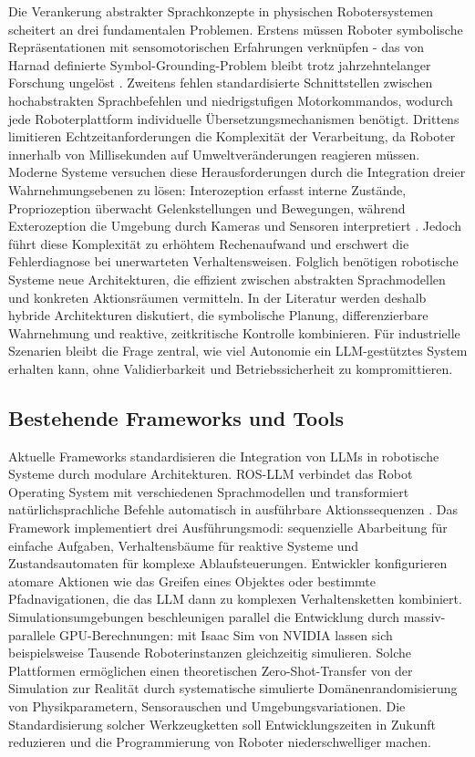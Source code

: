 Die Verankerung abstrakter Sprachkonzepte in physischen Robotersystemen
scheitert an drei fundamentalen Problemen. Erstens müssen Roboter symbolische
Repräsentationen mit sensomotorischen Erfahrungen verknüpfen - das von Harnad
definierte Symbol-Grounding-Problem bleibt trotz jahrzehntelanger Forschung
ungelöst . Zweitens fehlen standardisierte
Schnittstellen zwischen hochabstrakten Sprachbefehlen und niedrigstufigen
Motorkommandos, wodurch jede Roboterplattform individuelle
Übersetzungsmechanismen benötigt. Drittens limitieren Echtzeitanforderungen die
Komplexität der Verarbeitung, da Roboter innerhalb von Millisekunden auf
Umweltveränderungen reagieren müssen. Moderne Systeme versuchen diese
Herausforderungen durch die Integration dreier Wahrnehmungsebenen zu lösen:
Interozeption erfasst interne Zustände, Propriozeption überwacht
Gelenkstellungen und Bewegungen, während Exterozeption die Umgebung durch
Kameras und Sensoren interpretiert . Jedoch führt
diese Komplexität zu erhöhtem Rechenaufwand und erschwert die Fehlerdiagnose bei
unerwarteten Verhaltensweisen. Folglich benötigen robotische Systeme neue
Architekturen, die effizient zwischen abstrakten Sprachmodellen und konkreten
Aktionsräumen vermitteln. In der Literatur werden deshalb hybride Architekturen
diskutiert, die symbolische Planung, differenzierbare Wahrnehmung und reaktive,
zeitkritische Kontrolle kombinieren. Für industrielle Szenarien bleibt die Frage
zentral, wie viel Autonomie ein LLM-gestütztes System erhalten kann, ohne
Validierbarkeit und Betriebssicherheit zu kompromittieren.

\subsection{Bestehende Frameworks und Tools}

Aktuelle Frameworks standardisieren die Integration von LLMs in robotische
Systeme durch modulare Architekturen. ROS-LLM verbindet das Robot Operating
System mit verschiedenen Sprachmodellen und transformiert natürlichsprachliche
Befehle automatisch in ausführbare Aktionssequenzen .
Das Framework implementiert drei Ausführungsmodi: sequenzielle Abarbeitung für
einfache Aufgaben, Verhaltensbäume für reaktive Systeme und Zustandsautomaten
für komplexe Ablaufsteuerungen. Entwickler konfigurieren atomare Aktionen wie
das Greifen eines Objektes oder bestimmte Pfadnavigationen, die das LLM dann zu
komplexen Verhaltensketten kombiniert. Simulationsumgebungen beschleunigen
parallel die Entwicklung durch massiv-parallele GPU-Berechnungen: mit Isaac Sim
von NVIDIA lassen sich beispielsweise Tausende Roboterinstanzen gleichzeitig
simulieren. Solche Plattformen ermöglichen einen theoretischen
Zero-Shot-Transfer von der Simulation zur Realität durch systematische
simulierte Domänenrandomisierung von Physikparametern, Sensorauschen und
Umgebungsvariationen. Die Standardisierung solcher
Werkzeugketten soll Entwicklungszeiten in Zukunft reduzieren und die Programmierung von
Roboter niederschwelliger machen.

